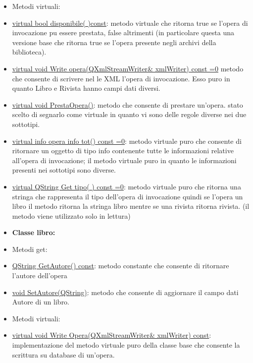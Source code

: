 \documentclass[10pt]{article}
\begin{document}
\begin{itemize}
\item Metodi virtuali:

		\item \underline{virtual bool disponibile( )const}: metodo virtuale che ritorna true se l'opera di invocazione pu essere prestata, false altrimenti (in 		particolare questa una versione base che ritorna true se l'opera presente negli archivi della biblioteca).

		\item \underline{virtual void Write opera(QXmlStreamWriter\& xmlWriter) const =0} metodo che consente di scrivere nel le XML l'opera di 				invocazione. Esso puro in quanto Libro e Rivista hanno campi dati diversi.

		\item \underline{virtual void PrestaOpera()}: metodo che consente di prestare un'opera. stato scelto di segnarlo come virtuale in quanto vi sono 			delle regole diverse nei due sottotipi.

 		\item \underline{virtual info opera info tot() const =0}: metodo virtuale puro che consente di ritornare un oggetto di tipo info contenente tutte le 			informazioni relative all'opera di invocazione; il metodo virtuale puro in quanto le informazioni presenti nei sottotipi sono diverse.

		\item \underline{virtual QString Get tipo( ) const =0}: metodo virtuale puro che ritorna una stringa che rappresenta il tipo dell'opera di 					invocazione quindi se l'opera un libro il metodo ritorna la stringa libro mentre se una rivista ritorna rivista. (il metodo viene utilizzato solo in lettura)

\item \textbf{Classe libro:}

\item Metodi get:

		\item \underline{QString GetAutore() const}: metodo constante che consente di ritornare l'autore dell'opera

		\item \underline{void SetAutore(QString)}: metodo che consente di aggiornare il campo dati Autore di un libro.

\item Metodi virtuali:

		\item \underline{virtual void Write Opera(QXmlStreamWriter\& xmlWriter) const}: implementazione del metodo virtuale puro della classe base che consente la scrittura su database di un'opera.


\end{itemize}
\end{document}
